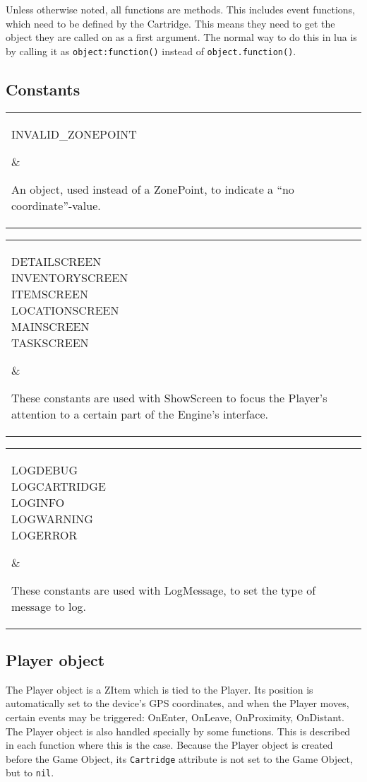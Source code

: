 \documentclass{article}
\begin{document}
Unless otherwise noted, all functions are methods. This includes event
functions, which need to be defined by the Cartridge.  This means they need to
get the object they are called on as a first argument. The normal way to do
this in lua is by calling it as \verb-object:function()- instead of
\verb-object.function()-.

\newcommand\codedef[2]{\par\noindent\begin{tabular}{|l|l|}\hline\parbox{.4\textwidth}{#1}&\parbox{.5\textwidth}{#2}\\\hline\end{tabular}\par}
\newcommand\funcdef[4]{
	\par\vskip.5\baselineskip
	\par\noindent\textbf{Function:} #1 $\rightarrow$ #2\par
	\noindent\textbf{Arguments:} \parbox{.8\textwidth}{#3}\par
	\noindent\textbf{Description:} \parbox{.8\textwidth}{#4}\par
	\vskip.5\baselineskip
}
\newcommand\attrdef[3]{
	\par\vskip.5\baselineskip
	\par\noindent\textbf{Attribute:} #1 (#2)\par
	\noindent\textbf{Description:} \parbox{.8\textwidth}{#3}\par
	\vskip.5\baselineskip
}
\subsection{Constants}
\codedef{INVALID\_ZONEPOINT}{An object, used instead of a ZonePoint, to indicate a ``no coordinate''-value.}
\codedef{DETAILSCREEN\\INVENTORYSCREEN\\ITEMSCREEN\\LOCATIONSCREEN\\MAINSCREEN\\TASKSCREEN}{These constants are used with ShowScreen to focus the Player's attention to a certain part of the Engine's interface.}
\codedef{LOGDEBUG\\LOGCARTRIDGE\\LOGINFO\\LOGWARNING\\LOGERROR}{These constants are used with LogMessage, to set the type of message to log.}

\subsection{Player object}
The Player object is a ZItem which is tied to the Player. Its position is
automatically set to the device's GPS coordinates, and when the Player moves,
certain events may be triggered: OnEnter, OnLeave, OnProximity, OnDistant. The
Player object is also handled specially by some functions. This is described in
each function where this is the case.  Because the Player object is created
before the Game Object, its \verb-Cartridge- attribute is not set to the Game
Object, but to \verb-nil-.
\end{document}
